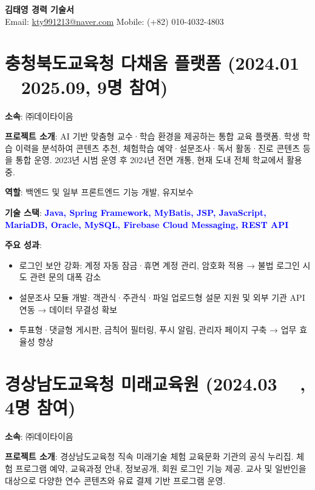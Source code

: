 \documentclass[a4paper,11pt]{article}
\newcommand{\tech}[1]{\textbf{\textcolor{blue}{#1}}}
\begin{document}
\begin{center}
    {\LARGE \textbf{김태영 경력 기술서}} \\[6pt]
    Email: \href{mailto:kty991213@naver.com}{kty991213@naver.com} \quad
    Mobile: (+82) 010-4032-4803
\end{center}



\section{충청북도교육청 다채움 플랫폼 (2024.01 ~ 2025.09, 9명 참여)}

\textbf{소속}: ㈜데이타이음

\textbf{프로젝트 소개}:  
AI 기반 맞춤형 교수·학습 환경을 제공하는 통합 교육 플랫폼.  
학생 학습 이력을 분석하여 콘텐츠 추천, 체험학습 예약·설문조사·독서 활동·진로 콘텐츠 등을 통합 운영.  
2023년 시범 운영 후 2024년 전면 개통, 현재 도내 전체 학교에서 활용 중.

\textbf{역할}: 백엔드 및 일부 프론트엔드 기능 개발, 유지보수

\textbf{기술 스택}: \tech{Java, Spring Framework, MyBatis, JSP, JavaScript, MariaDB, Oracle, MySQL, Firebase Cloud Messaging, REST API}

\textbf{주요 성과}:
\begin{itemize}[leftmargin=*]
  \item 로그인 보안 강화: 계정 자동 잠금·휴면 계정 관리, 암호화 적용 → 불법 로그인 시도 관련 문의 대폭 감소
  \item 설문조사 모듈 개발: 객관식·주관식·파일 업로드형 설문 지원 및 외부 기관 API 연동 → 데이터 무결성 확보
  \item 투표형·댓글형 게시판, 금칙어 필터링, 푸시 알림, 관리자 페이지 구축 → 업무 효율성 향상
\end{itemize}

\section{경상남도교육청 미래교육원 (2024.03 ~ , 4명 참여)}

\textbf{소속}: ㈜데이타이음

\textbf{프로젝트 소개}:  
경상남도교육청 직속 미래기술 체험 교육문화 기관의 공식 누리집.  
체험 프로그램 예약, 교육과정 안내, 정보공개, 회원 로그인 기능 제공.  
교사 및 일반인을 대상으로 다양한 연수 콘텐츠와 유료 결제 기반 프로그램 운영.
\end{document}
